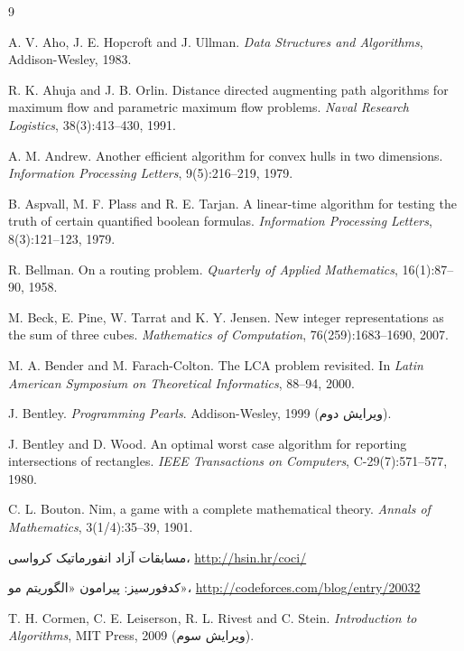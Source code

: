 \begin{thebibliography}{9}

  A. V. Aho, J. E. Hopcroft and J. Ullman.
  \emph{Data Structures and Algorithms},
  Addison-Wesley, 1983.

  R. K. Ahuja and J. B. Orlin.
  Distance directed augmenting path algorithms for maximum flow and parametric maximum flow problems.
  \emph{Naval Research Logistics}, 38(3):413--430, 1991.

  A. M. Andrew.
  Another efficient algorithm for convex hulls in two dimensions.
  \emph{Information Processing Letters}, 9(5):216--219, 1979.

  B. Aspvall, M. F. Plass and R. E. Tarjan.
  A linear-time algorithm for testing the truth of certain quantified boolean formulas.
  \emph{Information Processing Letters}, 8(3):121--123, 1979.

  R. Bellman.
  On a routing problem.
  \emph{Quarterly of Applied Mathematics}, 16(1):87--90, 1958.

  M. Beck, E. Pine, W. Tarrat and K. Y. Jensen.
  New integer representations as the sum of three cubes.
  \emph{Mathematics of Computation}, 76(259):1683--1690, 2007.

  M. A. Bender and M. Farach-Colton.
  The LCA problem revisited. In
  \emph{Latin American Symposium on Theoretical Informatics}, 88--94, 2000.

  J. Bentley.
  \emph{Programming Pearls}.
  Addison-Wesley, 1999 (ویرایش دوم).

  J. Bentley and D. Wood.
  An optimal worst case algorithm for reporting intersections of rectangles.
  \emph{IEEE Transactions on Computers}, C-29(7):571--577, 1980.

  C. L. Bouton.
  Nim, a game with a complete mathematical theory.
  \emph{Annals of Mathematics}, 3(1/4):35--39, 1901.


  مسابقات آزاد انفورماتیک کرواسی، \url{http://hsin.hr/coci/}

  کدفورسیز: پیرامون «الگوریتم مو»،
  \url{http://codeforces.com/blog/entry/20032}

  T. H. Cormen, C. E. Leiserson, R. L. Rivest and C. Stein.
  \emph{Introduction to Algorithms}, MIT Press, 2009 (ویرایش سوم).


\end{thebibliography}
